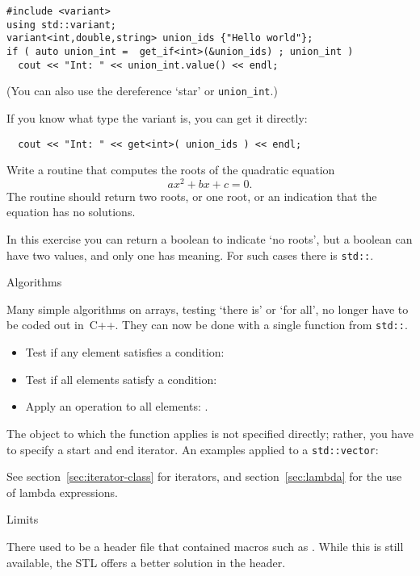 \begin{lstlisting}
#include <variant>
using std::variant;
variant<int,double,string> union_ids {"Hello world"};
if ( auto union_int =  get_if<int>(&union_ids) ; union_int )
  cout << "Int: " << union_int.value() << endl;
\end{lstlisting}
(You can also use the dereference `star' or \lstinline{union_int}.)

If you know what type the variant is, you
can get it directly:
\begin{lstlisting}
  cout << "Int: " << get<int>( union_ids ) << endl;
\end{lstlisting}

\begin{exercise}
  Write a routine that computes the roots of the quadratic equation
  \[ ax^2+bx+c=0. \]
  The routine should return two roots, or one root, or an indication
  that the equation has no solutions.
\end{exercise}

In this exercise you can return a boolean to indicate `no roots', but
a boolean can have two values, and only one has meaning. For such
cases there is \lstinline{std::}.

 {Algorithms}
\label{sec:algorithm}

Many simple algorithms on arrays, testing `there is' or `for all', no
longer have to be coded out in~C++. They can now be done with a single
function from \lstinline{std::}.
\begin{itemize}
\item Test if any element satisfies a condition:
\item Test if all elements satisfy a condition:
\item Apply an operation to all elements: .
\end{itemize}

The object to which the function applies is not specified directly; 
rather, you have to specify a start
and end iterator. An examples applied to a 
\lstinline{std::vector}:
%

See section~\ref{sec:iterator-class} for iterators, and
section~\ref{sec:lambda} for the use of lambda expressions.

 {Limits}
\label{sec:limits}

There used to be a header file  that contained
macros such as . While this is still available,
the \ac{STL} offers a better solution in the
 header.


